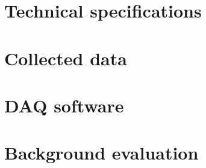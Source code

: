 \documentclass[a4paper, 12pt]{report}
\begin{document}
\chapter{Technical specifications}


\chapter{Collected data}


\chapter{DAQ software}


\chapter{Background evaluation}


\newpage
\end{document}
